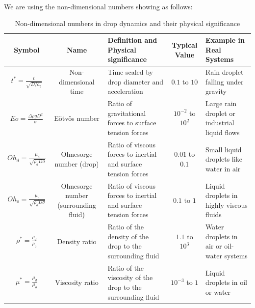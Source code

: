 \documentclass[12pt]{article}
\begin{document}





We are using the non-dimensional numbers showing as follows:


\begin{table}[H]
\scriptsize
\centering
\caption{Non-dimensional numbers in drop dynamics and their physical significance}
\renewcommand{\arraystretch}{1.2} %
\begin{tabularx}{\textwidth}{|c|c|X|c|X|}
\hline
\textbf{Symbol} & \textbf{Name} & \textbf{Definition and Physical significance} & \textbf{Typical Value} & \textbf{Example in Real Systems} \\ \hline
$t^* = \frac{t}{\sqrt{D/a_z}}$ & Non-dimensional time & Time scaled by drop diameter and acceleration & $0.1$ to $10$ & Rain droplet falling under gravity \\ \hline
$Eo = \frac{\Delta \rho g D^2}{\sigma}$ & Eötvös number & Ratio of gravitational forces to surface tension forces & $10^{-2}$ to $10^2$ & Large rain droplet or industrial liquid flows \\ \hline
$Oh_d = \frac{\mu_d}{\sqrt{\rho_d D \sigma}}$ & Ohnesorge number (drop) & Ratio of viscous forces to inertial and surface tension forces & $0.01$ to $0.1$ & Small liquid droplets like water in air \\ \hline
$Oh_o = \frac{\mu_o}{\sqrt{\rho_o D \sigma}}$ & Ohnesorge number (surrounding fluid) & Ratio of viscous forces to inertial and surface tension forces & $0.1$ to $1$ & Liquid droplets in highly viscous fluids \\ \hline
$\rho^* = \frac{\rho_d}{\rho_o}$ & Density ratio & Ratio of the density of the drop to the surrounding fluid & $1.1$ to $10^3$ & Water droplets in air or oil-water systems \\ \hline
$\mu^* = \frac{\mu_d}{\mu_o}$ & Viscosity ratio & Ratio of the viscosity of the drop to the surrounding fluid & $10^{-3}$ to $1$ & Liquid droplets in oil or water \\ \hline
\end{tabularx}
\label{tab:NonDimensionalNumbersSignificance}
\end{table}
\end{document}
